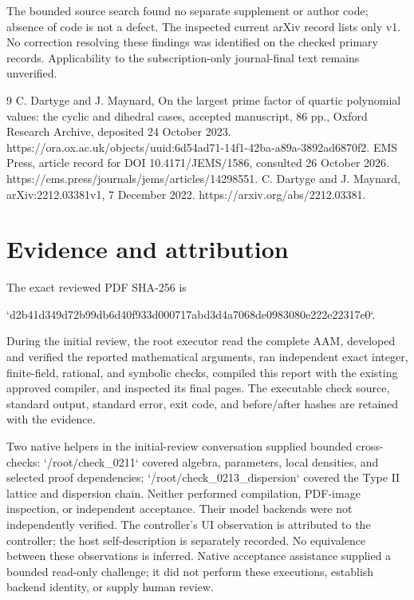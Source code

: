 \documentclass[10pt]{article}
\begin{document}
The bounded source search found no separate supplement or author code; absence of code is not a defect. The inspected current arXiv record lists only v1. No correction resolving these findings was identified on the checked primary records. Applicability to the subscription-only journal-final text remains unverified.\par
9 C. Dartyge and J. Maynard, On the largest prime factor of quartic polynomial values: the cyclic and dihedral cases, accepted manuscript, 86 pp., Oxford Research Archive, deposited 24 October 2023. https://ora.ox.ac.uk/objects/uuid:6d54ad71-14f1-42ba-a89a-3892ad6870f2. EMS Press, article record for DOI 10.4171/JEMS/1586, consulted 26 October 2026. https://ems.press/journals/jems/articles/14298551. C. Dartyge and J. Maynard, arXiv:2212.03381v1, 7 December 2022. https://arxiv.org/abs/2212.03381.\par
\section*{Evidence and attribution}
The exact reviewed PDF SHA-256 is\par
`d2b41d349d72b99db6d40f933d000717abd3d4a7068de0983080e222e22317e0`.\par
During the initial review, the root executor read the complete AAM, developed and verified the reported mathematical arguments, ran independent exact integer, finite-field, rational, and symbolic checks, compiled this report with the existing approved compiler, and inspected its final pages. The executable check source, standard output, standard error, exit code, and before/after hashes are retained with the evidence.\par
Two native helpers in the initial-review conversation supplied bounded cross-checks: `/root/check\_0211` covered algebra, parameters, local densities, and selected proof dependencies; `/root/check\_0213\_dispersion` covered the Type II lattice and dispersion chain. Neither performed compilation, PDF-image inspection, or independent acceptance. Their model backends were not independently verified. The controller’s UI observation is attributed to the controller; the host self-description is separately recorded. No equivalence between these observations is inferred. Native acceptance assistance supplied a bounded read-only challenge; it did not perform these executions, establish backend identity, or supply human review.\par
\end{document}
